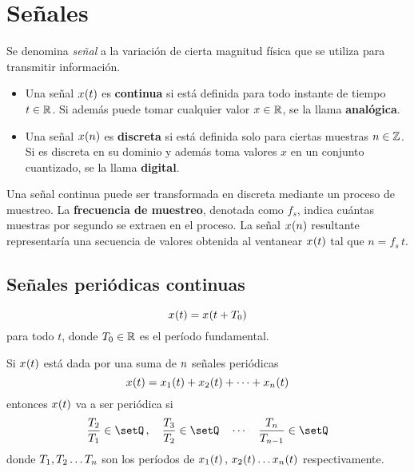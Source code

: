 \chapter{Señales}

Se denomina \emph{señal} a la variación de cierta magnitud física que se utiliza para transmitir información.

\begin{itemize}
    \item
    Una señal $\fx[x]{t}$ es \textbf{continua} si está definida para todo instante de tiempo $t \in \setR$.
    Si además puede tomar cualquier valor $x \in \setR$, se la llama \textbf{analógica}.

    \item
    Una señal $\fx[x]{n}$ es \textbf{discreta} si está definida solo para ciertas muestras $n \in \setZ$.
    Si es discreta en su dominio y además toma valores $x$ en un conjunto cuantizado, se la llama \textbf{digital}.
\end{itemize}

Una señal continua puede ser transformada en discreta mediante un proceso de muestreo.
La \textbf{frecuencia de muestreo}, denotada como $f_s$, indica cuántas muestras por segundo se extraen en el proceso.
La señal $\fx[x]{n}$ resultante representaría una secuencia de valores obtenida al ventanear $\fx[x]{t}$ tal que $n = f_s \, t$.

\section{Señales periódicas continuas}

\begin{mdframed}[style=DefinitionFrame]
    \begin{defn}
        \label{defn:funcPeriodCont}
    \end{defn}
    \begin{equation*}
        \fx[x]{t} = \fx[x]{t + T_0}
    \end{equation*}
    para todo $t$, donde $T_0 \in \setR$ es el período fundamental.
\end{mdframed}

Si $\fx[x]{t}$ está dada por una suma de $\nth$ señales periódicas
\[
    \fx[x]{t} = \fx[x_1]{t} + \fx[x_2]{t} + \dots + \fx[x_\nth]{t}
\]
entonces $\fx[x]{t}$ va a ser periódica si
\[
    \frac{T_2}{T_1} \in \setQ \, , \quad \frac{T_3}{T_2} \in \setQ \quad \cdots \quad \frac{T_\nth}{T_{\nth - 1}} \in \setQ
\]
donde $T_1, T_2 \dots T_\nth$ son los períodos de $\fx[x_1]{t} , \, \fx[x_2]{t} \dots \fx[x_\nth]{t}$ respectivamente.

